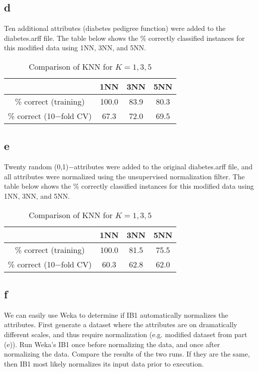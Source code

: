 \documentclass{article}
\begin{document}
\subsection*{d}
Ten additional attributes (diabetes pedigree function) were added to the diabetes.arff file. The table below shows the \% correctly classified instances for this modified data using 1NN, 3NN, and 5NN.\\

\begin{table}[ht]
\caption{Comparison of KNN for $ K = 1,3,5$}
\centering
\begin{tabular}{c c c c}
\hline\hline
 & 1NN & 3NN & 5NN\\ [0.5ex]
\hline
\% correct (training) & 100.0 & 83.9 & 80.3 \\ 
\% correct (10$-$fold CV) & 67.3 & 72.0 & 69.5 \\
\hline
\end{tabular}
\label{table:table2d} 
\end{table}

\subsection*{e}
Twenty random (0,1)$-$attributes were added to the original diabetes.arff file, and all attributes were normalized using the unsupervised normalization filter. The table below shows the \% correctly classified instances for this modified data using 1NN, 3NN, and 5NN.

\begin{table}[ht]
\caption{Comparison of KNN for $ K = 1,3,5$}
\centering
\begin{tabular}{c c c c}
\hline\hline
 & 1NN & 3NN & 5NN\\ [0.5ex]
\hline
\% correct (training) & 100.0 & 81.5 & 75.5 \\ 
\% correct (10$-$fold CV) & 60.3 & 62.8 & 62.0 \\
\hline
\end{tabular}
\label{table:table2e} 
\end{table}

\subsection*{f}
We can easily use Weka to determine if IB1 automatically normalizes the attributes. First generate a dataset where the attributes are on dramatically different scales, and thus require normalization (e.g. modified dataset from part (e)). Run Weka\rq{}s IB1 once before normalizing the data, and once after normalizing the data. Compare the results of the two runs. If they are the same, then IB1 most likely normalizes its input data prior to execution.\\
\end{document}
